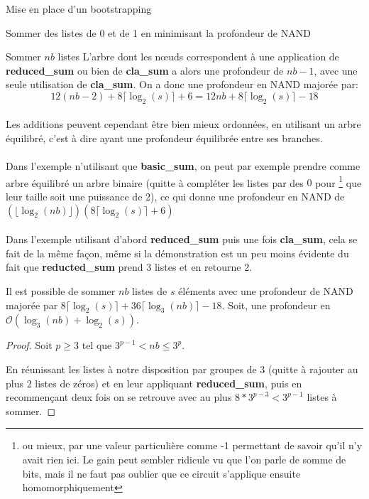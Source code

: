 \begin{section}{Mise en place d'un bootstrapping}
\begin{subsection}{Sommer des listes de 0 et de 1 en minimisant la profondeur de NAND}
\begin{subsubsection}{Sommer $nb$ listes}
L'arbre dont les n\oe{}uds correspondent à une application de \textbf{reduced\_sum}
ou bien de \textbf{cla\_sum} a alors une profondeur de $nb - 1$, avec une seule utilisation de \textbf{cla\_sum}. On a donc une profondeur en NAND majorée par:
\[ 12(nb - 2) + 8 \lceil \log_2(s) \rceil + 6 = 12 nb + 8 \lceil \log_2(s) \rceil - 18\]
	
\paragraph{}
Les additions peuvent cependant être bien mieux ordonnées, en utilisant 
un arbre équilibré, c'est à dire ayant une profondeur équilibrée entre ses branches.

\paragraph{}
Dans l'exemple n'utilisant que \textbf{basic\_sum}, on peut par exemple prendre 
comme arbre équilibré un arbre binaire (quitte à compléter les listes par des $0$ pour
\footnote{ou mieux, par une valeur particulière comme -1 permettant de savoir qu'il n'y avait rien ici. Le gain peut 
sembler ridicule vu que l'on parle de somme de bits, mais il ne faut pas oublier que ce circuit s'applique 
ensuite homomorphiquement} que leur taille
soit une puissance de 2), ce qui donne une profondeur en NAND de   
$(\lfloor \log_2(nb) \rfloor)(8\lceil\log_2(s)\rceil + 6)$

\paragraph{}
Dans l'exemple utilisant d'abord \textbf{reduced\_sum} puis une fois \textbf{cla\_sum}, 
cela se fait de la même façon, même si la démonstration est un peu moins évidente du fait que
\textbf{reducted\_sum} prend 3 listes et en retourne 2.

\begin{prop}
\label{sum_list}
Il est possible de sommer $nb$ listes de $s$ éléments avec une profondeur de NAND majorée par 
$8 \lceil \log_2(s) \rceil + 36\lceil\log_3(nb)\rceil -18$. Soit, une profondeur en $\mathcal{O}(\log_3(nb) + \log_2(s))$.
\end{prop}

\begin{proof}
Soit $p \geqslant 3$ tel que $3^{p-1} < nb \leqslant 3^{p}$.

En réunissant les listes à notre disposition par groupes de 3 (quitte à rajouter au plus 2 listes de zéros) et en leur appliquant \textbf{reduced\_sum}, puis
en recommençant deux fois on se retrouve avec au plus \mbox{$8 * 3^{p-3} < 3^{p-1}$} listes à sommer.


\end{proof}
\end{subsubsection}
\end{subsection}
\end{section}
